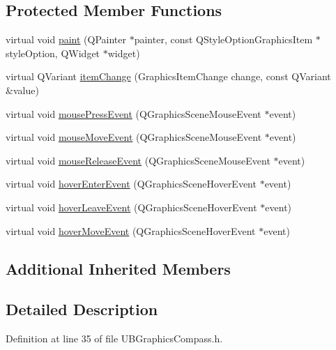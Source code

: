 \subsection*{Protected Member Functions}
\begin{DoxyCompactItemize}
\item 
virtual void \hyperlink{class_u_b_graphics_compass_a3ef54b013e7d4894fc460454fac4d1b2}{paint} (Q\-Painter $\ast$painter, const Q\-Style\-Option\-Graphics\-Item $\ast$style\-Option, Q\-Widget $\ast$widget)
\item 
virtual Q\-Variant \hyperlink{class_u_b_graphics_compass_a1312b497b77914e6d55314cdb2488fd0}{item\-Change} (Graphics\-Item\-Change change, const Q\-Variant \&value)
\item 
virtual void \hyperlink{class_u_b_graphics_compass_ac46f798cbb16c5c96fbca1f261822e53}{mouse\-Press\-Event} (Q\-Graphics\-Scene\-Mouse\-Event $\ast$event)
\item 
virtual void \hyperlink{class_u_b_graphics_compass_a524de67b4d3b7dcdfc98ba061038cd14}{mouse\-Move\-Event} (Q\-Graphics\-Scene\-Mouse\-Event $\ast$event)
\item 
virtual void \hyperlink{class_u_b_graphics_compass_a5fcfc89194559c4a2fa655f7ac7f8ff1}{mouse\-Release\-Event} (Q\-Graphics\-Scene\-Mouse\-Event $\ast$event)
\item 
virtual void \hyperlink{class_u_b_graphics_compass_a2667b78936a87cf0b86573c4847df86d}{hover\-Enter\-Event} (Q\-Graphics\-Scene\-Hover\-Event $\ast$event)
\item 
virtual void \hyperlink{class_u_b_graphics_compass_ae26f41adcc302778ed128bdd359b2b06}{hover\-Leave\-Event} (Q\-Graphics\-Scene\-Hover\-Event $\ast$event)
\item 
virtual void \hyperlink{class_u_b_graphics_compass_abf554765c0e6a0f5d04d366feefc16e5}{hover\-Move\-Event} (Q\-Graphics\-Scene\-Hover\-Event $\ast$event)
\end{DoxyCompactItemize}
\subsection*{Additional Inherited Members}


\subsection{Detailed Description}


Definition at line 35 of file U\-B\-Graphics\-Compass.\-h.



